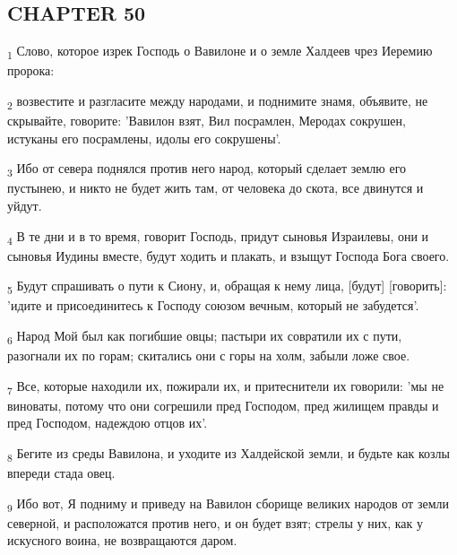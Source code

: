 \subsection{CHAPTER 50}
\begin{tcolorbox}
\textsubscript{1} Слово, которое изрек Господь о Вавилоне и о земле Халдеев чрез Иеремию пророка:
\end{tcolorbox}
\begin{tcolorbox}
\textsubscript{2} возвестите и разгласите между народами, и поднимите знамя, объявите, не скрывайте, говорите: 'Вавилон взят, Вил посрамлен, Меродах сокрушен, истуканы его посрамлены, идолы его сокрушены'.
\end{tcolorbox}
\begin{tcolorbox}
\textsubscript{3} Ибо от севера поднялся против него народ, который сделает землю его пустынею, и никто не будет жить там, от человека до скота, все двинутся и уйдут.
\end{tcolorbox}
\begin{tcolorbox}
\textsubscript{4} В те дни и в то время, говорит Господь, придут сыновья Израилевы, они и сыновья Иудины вместе, будут ходить и плакать, и взыщут Господа Бога своего.
\end{tcolorbox}
\begin{tcolorbox}
\textsubscript{5} Будут спрашивать о пути к Сиону, и, обращая к нему лица, [будут] [говорить]: 'идите и присоединитесь к Господу союзом вечным, который не забудется'.
\end{tcolorbox}
\begin{tcolorbox}
\textsubscript{6} Народ Мой был как погибшие овцы; пастыри их совратили их с пути, разогнали их по горам; скитались они с горы на холм, забыли ложе свое.
\end{tcolorbox}
\begin{tcolorbox}
\textsubscript{7} Все, которые находили их, пожирали их, и притеснители их говорили: 'мы не виноваты, потому что они согрешили пред Господом, пред жилищем правды и пред Господом, надеждою отцов их'.
\end{tcolorbox}
\begin{tcolorbox}
\textsubscript{8} Бегите из среды Вавилона, и уходите из Халдейской земли, и будьте как козлы впереди стада овец.
\end{tcolorbox}
\begin{tcolorbox}
\textsubscript{9} Ибо вот, Я подниму и приведу на Вавилон сборище великих народов от земли северной, и расположатся против него, и он будет взят; стрелы у них, как у искусного воина, не возвращаются даром.
\end{tcolorbox}
